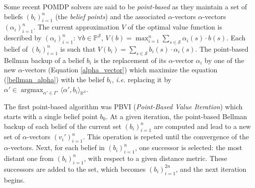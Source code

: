Some recent POMDP solvers are said to be \textit{point-based} as they maintain
a set of beliefs $(b_i)_{i=1}^n$ (the \textit{belief points}) 
and the associated $\alpha$-vectors $\alpha$-vectors $(\alpha_i)_{i=1}^n$.
The current approximation $V$ of the optimal value function is described 
by $(\alpha_i)_{i=1}^n$: $\forall b \in \mathbb{P}^{\mathcal{S}}$,
$V(b) = \max_{i=1}^n \sum_{s \in \mathcal{S}} \alpha_i(s) \cdot b(s)$. 
Each belief of $(b_i)_{i=1}^n$ is such that
$V(b_i) = \sum_{s \in \mathcal{S}} b_i(s) \cdot \alpha_i(s)$.
The point-based Bellman backup of a belief $b_i$ is the replacement of its $\alpha$-vector 
$\alpha_i$ by one of the new $\alpha$-vectors (Equation \ref{alpha_vector}) 
which maximize the equation (\ref{bellman_alpha}) 
with the belief $b_i$, \textit{i.e.} replacing it by 
$\alpha' \in \operatorname*{argmax}_{\alpha' \in \Gamma'} \langle \alpha', b_i \rangle_{\mathbb{R}^{\mathcal{S}}}$.

The first point-based algorithm was PBVI (\textit{Point-Based Value Iteration})
\cite{Pineau_2003_4826} which starts with a single belief point $b_0$.
At a given iteration, the point-based Bellman backup of each belief 
of the current set $(b_i)_{i=1}^n$ are computed and lead to a new set of 
$\alpha$-vectors $(v_i')_{i=1}^n$. This operation is repeted until
the convergence of the $\alpha$-vectors. Next, for each belief in $(b_i)_{i=1}^n$,
one successor is selected: the most distant one from $(b_i)_{i=1}^n$, 
with respect to a given distance metric.
These successors are added to the set, which becomes $(b_i)_{i=1}^{2n}$,
and the next iteration begins.


